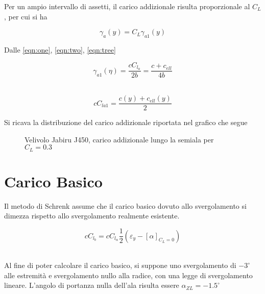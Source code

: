 Per un ampio intervallo di assetti, il carico addizionale risulta proporzionale al $C_L$, per cui si ha 

\begin{equation}
\label{eqn:one}
\gamma_a(y)=C_L \gamma_{a1}(y)
\end{equation}

Dalle \ref{eqn:one}, \ref{eqn:two}, \ref{eqn:tree}


\begin{equation}
\label{eqn:two}
\gamma_{a1}(\eta)=\frac{cC_{l_a}}{2b}=\frac{c+c_{ell}}{4b}
\end{equation}

\noindent \\

\begin{equation}
\label{eqn:tree}
cC_{la1}=\frac{c(y)+c_{ell}(y)}{2}
\end{equation}

Si ricava la distribuzione del carico addizionale riportata nel grafico che segue


\begin{figure} [h]
\centering
{}
\caption{\footnotesize Velivolo Jabiru J450, carico addizionale lungo la semiala per {\bfseries $C_L=0.3$}}
\end{figure}


\section{Carico Basico}

Il metodo di Schrenk assume che il carico basico dovuto allo svergolamento si dimezza rispetto allo svergolamento realmente esistente.

\begin{equation}
\label{eqn:bas}
cC_{l_b}=cC_{l_{\alpha}} \frac{1}{2}(\varepsilon_y-[\alpha]_{C_L=0})
\end{equation}

\noindent \\

Al fine di poter calcolare il carico basico, si suppone uno svergolamento di $-3^\circ $ alle estremità e svergolamento nullo alla radice, con una legge di svergolamento lineare. L’angolo di portanza nulla dell’ala risulta essere $ \alpha_{ZL}=-1.5^\circ$


